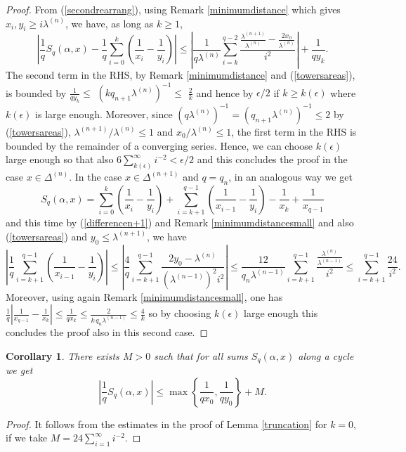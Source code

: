 \documentclass{conm-p-l}
\numberwithin{equation}{section}
\newtheorem{cor}[theorem]{Corollary}
\begin{document}
\begin{proof}
From (\ref{secondrearrang}), using 
 Remark \ref{minimumdistance}
 which gives $x_i, y_i \geq i \lambda^{(n)}$, we have, as long as $k\geq 1$, 
\begin{equation*}
\left| \frac{1}{q} {S_{{q}}({\alpha}, {{x}})}  - \frac{1}{q}\sum_{i=0}^{k} \left(
\frac{1}{x_i} - \frac{1}{y_i} \right) \right|
\leq
\left|\frac{1}{q
 \lambda^{(n)} }  \sum_{i=k}^{q-2}  \frac{ \frac{\lambda^{(n+1)}}{ \lambda^{(n)}
} -\frac{2x_0} {\lambda^{(n)} }}{i^2}\right| + \frac{1}{q y_k}.
 \end{equation*}
The second term in the RHS, by  Remark \ref{minimumdistance} and (\ref{towersareas}), is bounded by  $\frac{1}{q y_k} \leq$ ${(k q_{n+1} \lambda^{(n)})}^{-1} \leq$ $\frac{ 2}{k} $ and hence by ${\epsilon}/{2}$ if $k\geq k(\epsilon)$ where $k(\epsilon ) $ is large enough.  
Moreover, since $(q\lambda^{(n)})^{-1} = (q_{n+1} \lambda^{(n)})^{-1}\leq 2$ by (\ref{towersareas}), 
$\lambda^{(n+1)}/ \lambda^{(n)}\leq 1$ and $x_0/\lambda^{(n)}\leq 1$,
 the first term in the RHS is bounded by the remainder of a converging series. Hence, we can
choose $k(\epsilon)$ large enough so that also  $ 6 \sum_{k(\epsilon)}^{\infty} i^{-2} <
\epsilon/2$ and this concludes the proof in the case ${x}\in \Delta^{(n)}$.
In the case  ${x}\in \Delta^{(n+1)}$ and $q=q_n$, in an  analogous way we get
\begin{equation*}
 {S_{{q}}({\alpha}, {{x}})} = \sum_{i=0}^k \left( \frac{1}{x_{i}}- \frac{1}{y_i} \right) 
+ \sum_{i=k+1}^{q-1} \left( \frac{1}{x_{i-1}} - \frac{1}{y_i} \right) - \frac{1}{x_{k}} + \frac{1}{x_{q-1}}
\end{equation*}
and this time by   (\ref{differencen+1}) and Remark \ref{minimumdistancesmall} and also (\ref{towersareas}) and $y_0\leq \lambda^{(n+1)} $, we have
\begin{equation*}
\left|  \frac{1}{q}\sum_{i=k+1}^{q-1} \left( \frac{1}{x_{i-1}} - \frac{1}{y_i}
\right) \right| \leq
\left|\frac{4}{q}
  \sum_{i=k+1}^{q-1}  \frac{2  y_0 -  \lambda^{(n)} }{(\lambda^{(n-1)})^2
i^2}\right|\leq \frac{12}{q_n \lambda^{(n-1)}
} \sum_{i=k+1}^{q-1}  \frac{ \frac{\lambda^{(n)}}{\lambda^{(n-1)} } }{ i^2}\leq
\sum_{i=k+1}^{q-1}  \frac{24}{ i^{2}}.
 \end{equation*}
Moreover, using again Remark \ref{minimumdistancesmall},  one has $\frac{1}{q}\left|\frac{1}{x_{q-1}}- \frac{1}{x_{k}} \right| \leq \frac{1}{q x_k} \leq\frac{2}{ k\, q_{n}\lambda^{(n-1)}}\leq \frac{4}{k}$ so by choosing $k(\epsilon)$ large enough this concludes the proof also in this second case.
\end{proof}
\begin{cor}\label{cycleestimatelemma}  There exists $M>0$ such that for all sums
${S_{{q}}({\alpha}, {{x}})}$ along a cycle
we get\begin{equation}\label{estimatecycle}
\left| \frac{1}{q} {S_{{q}}({\alpha}, {{x}})}\right| \leq  \max \left\{\frac{1}{q
x_0}, \frac{1}{q y_0} \right\} + M.
\end{equation}
\end{cor}
\begin{proof}
It follows from the estimates in the proof of Lemma \ref{truncation} for $k=0$,
if we take $M=24 \sum_{i=1}^{\infty} {i^{-2}} $.
\end{proof}
\end{document}

